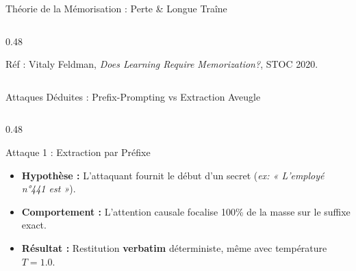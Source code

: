 \documentclass[aspectratio=169, 10pt, table]{beamer}
\begin{document}
\begin{frame}{Théorie de la Mémorisation : Perte \& Longue Traîne}
\begin{columns}[T]
\begin{column}{0.48\textwidth}

            \vspace{0.1cm}
            {\tiny Réf : Vitaly Feldman, \emph{Does Learning Require Memorization?}, STOC 2020.}
        \end{column}
    \end{columns}
\end{frame}

\begin{frame}{Attaques Déduites : Prefix-Prompting vs Extraction Aveugle}
    \begin{columns}[T]
        \begin{column}{0.48\textwidth}
            \begin{block}{Attaque 1 : Extraction par Préfixe}
                \small
                \begin{itemize}
                    \item \textbf{Hypothèse :} L'attaquant fournit le début d'un secret (\emph{ex: « L'employé n°441 est »}).
                    \item \textbf{Comportement :} L'attention causale focalise 100\% de la masse sur le suffixe exact.
                    \item \textbf{Résultat :} Restitution \textbf{verbatim} déterministe, même avec température $T=1.0$.
                \end{itemize}
            \end{block}
        \end{column}


\end{columns}
\end{frame}
\end{document}
